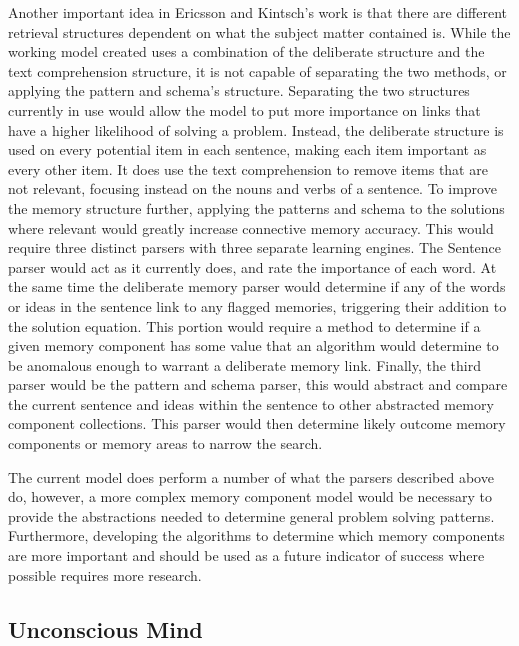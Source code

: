 Another important idea in Ericsson and Kintsch's work is that there are different retrieval structures dependent on what the subject matter contained is.  While the working model created uses a combination of the deliberate structure and the text comprehension structure, it is not capable of separating the two methods, or applying the pattern and schema's structure.  Separating the two structures currently in use would allow the model to put more importance on links that have a higher likelihood of solving a problem.  Instead, the deliberate structure is used on every potential item in each sentence, making each item important as every other item.  It does use the text comprehension to remove items that are not relevant, focusing instead on the nouns and verbs of a sentence.  To improve the memory structure further, applying the patterns and schema to the solutions where relevant would greatly increase connective memory accuracy.  This would require three distinct parsers with three separate learning engines.  The Sentence parser would act as it currently does, and rate the importance of each word.  At the same time the deliberate memory parser would determine if any of the words or ideas in the sentence link to any flagged memories, triggering their addition to the solution equation.  This portion would require a method to determine if a given memory component has some value that an algorithm would determine to be anomalous enough to warrant a deliberate memory link. Finally, the third parser would be the pattern and schema parser, this would abstract and compare the current sentence and ideas within the sentence to other abstracted memory component collections.  This parser would then determine likely outcome memory components or memory areas to narrow the search.

The current model does perform a number of what the parsers described above do, however, a more complex memory component model would be necessary to provide the abstractions needed to determine general problem solving patterns.  Furthermore, developing the algorithms to determine which memory components are more important and should be used as a future indicator of success where possible requires more research.

\subsection{Unconscious Mind}


